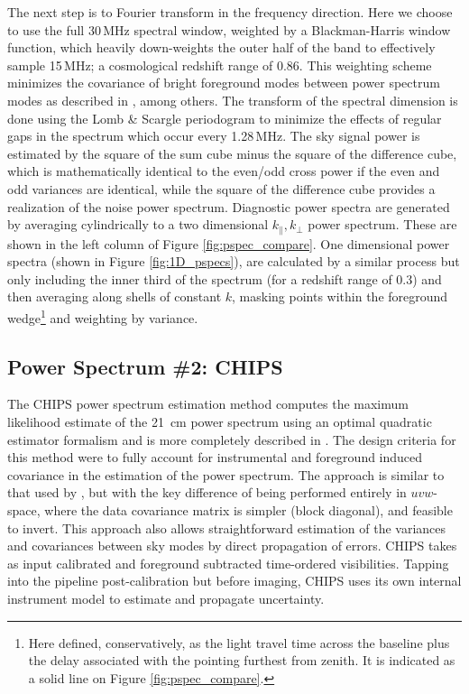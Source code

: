 \documentclass[twolcolumn,iop]{emulateapj}
\def\chipscite{\cite{2016arXiv160102073T}}
\begin{document}
The next step is to Fourier transform in the frequency direction. Here we choose to use the full 30\,MHz spectral window, weighted by a Blackman-Harris window function, which heavily down-weights the outer half of the band to effectively sample 15\,MHz; a cosmological redshift range of 0.86. This weighting scheme minimizes the covariance of bright foreground modes between power spectrum modes as described in \cite{Thyagarajan:2013p10039,Parsons:2012p8896,Vedantham:2012p9026}, among others.  The transform of the spectral dimension is done using the Lomb \& Scargle periodogram to minimize the effects of regular gaps in the spectrum which occur every 1.28\,MHz.    The sky signal power is  estimated by the square of the sum cube minus the square of the difference cube, which  is mathematically identical to the even/odd cross power if the even and odd variances are identical, while the square of the difference cube provides a realization of the noise power spectrum. Diagnostic power spectra are generated by averaging cylindrically to a two dimensional $k_{\|},k_{\bot}$ power spectrum.  These are shown in the left column of Figure \ref{fig:pspec_compare}.  One dimensional power spectra (shown in Figure \ref{fig:1D_pspecs}), are calculated by a similar process but only including the inner third of the spectrum (for a redshift range of 0.3) and then averaging along shells of constant $k$, masking points within the foreground wedge\footnote{Here defined, conservatively, as the light travel time across the baseline plus the delay associated with the pointing furthest from zenith. It is indicated as a solid line on Figure \ref{fig:pspec_compare}.} and weighting by variance.






\subsection{Power Spectrum \#2: CHIPS}
\label{sec:CHIPS}
The CHIPS power spectrum estimation method computes the maximum likelihood estimate of the 21~cm power spectrum using an optimal quadratic estimator formalism and is more completely described in \chipscite{}.  The design criteria for this method were to fully account for instrumental and foreground induced covariance in the estimation of the power spectrum.  The approach is similar to that used by \cite{Liu:2011p8763}, but with the key difference of being performed entirely in $uvw$-space, where the data covariance matrix is simpler (block diagonal), and feasible to invert. This approach also allows straightforward estimation of the variances and covariances between sky modes by direct propagation of errors. CHIPS takes as input calibrated and foreground subtracted time-ordered visibilities. Tapping into the pipeline post-calibration but before imaging, CHIPS uses its own internal instrument model to estimate and propagate uncertainty.	
\end{document}
